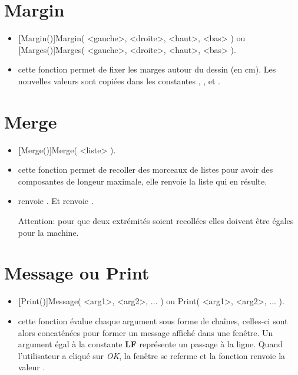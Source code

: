 \section{Margin}\label{cmdMarges}

\begin{itemize}
 \item \util \textbf[Margin()]{Margin( <gauche>, <droite>, <haut>, <bas> )} ou \textbf[Marges()]{Marges( <gauche>, <droite>, <haut>, <bas> )}.
 \item \desc cette fonction permet de fixer les marges autour du dessin (en cm). Les nouvelles valeurs sont copiées dans les constantes , ,  et .
\end{itemize}


\section{Merge}\label{cmdMerge}

\begin{itemize}
 \item \util \textbf[Merge()]{Merge( <liste> )}.
 \item \desc cette fonction permet de recoller des morceaux de listes pour avoir des composantes de longeur maximale, elle renvoie la liste qui en résulte.
 \item \exem {} renvoie \res{[1, 2, 3, 4, 5]}. Et  renvoie \res{[1, 2, jump, 4, 3, 5]}.

Attention: pour que deux extrémités soient recollées elles doivent être égales pour la machine.
\end{itemize}


\section{Message ou Print}\label{cmdMessage}

\begin{itemize}
 \item \util \textbf[Print()]{Message( <arg1>, <arg2>, ... ) ou Print( <arg1>, <arg2>, ... )}.
 \item \desc cette fonction évalue chaque argument sous forme de chaînes, celles-ci sont alors concaténées pour former un message affiché dans une fenêtre. Un argument égal à la constante \textbf{LF} représente un passage à la ligne.
 Quand l'utilisateur a cliqué sur \textit{OK}, la fenêtre se referme et la fonction renvoie la valeur \Nil. 
\end{itemize}

